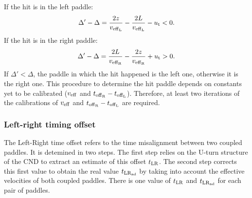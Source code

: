 If the hit is in the left paddle:
\begin{equation}
\Delta'-\Delta= \frac{2z}{v_{\rm{eff}_L}} - \frac{2L}{v_{\rm{eff}_L}} -u_{\rm{t}} <0.
\end{equation}
If the hit is in the right paddle:
\begin{equation}
\Delta'-\Delta= \frac{2L}{v_{\rm{eff}_{\rm{R}}}}-\frac{2z}{v_{\rm{eff}_{\rm{R}}}} +u_{\rm{t}} >0.
\end{equation}
If $\Delta'<\Delta$, the paddle in which the hit happened is the left one, otherwise it is the right one. This procedure to determine the hit paddle depends on constants yet to be calibrated ($v_{\rm{eff}}$ and $t_{\rm{off}_{\rm{R}}}-t_{\rm{off}_{\rm{L}}}$). Therefore, at least two iterations of the calibrations of $v_{\rm{eff}}$ and $t_{\rm{off}_{\rm{R}}}-t_{\rm{off}_{\rm{L}}}$ are required.

\subsubsection{Left-right timing offset}

The Left-Right time offset refers to the time misalignment between two coupled paddles. It is detemined in two steps. The first step relies on the U-turn structure of the CND to extract an estimate of this offset $t_{\rm{LR}}$. The second step corrects this first value to obtain the real value $t_{\rm{LR}_{\rm{ad}}}$ by taking into account the effective velocities of both coupled paddles. There is one value of $t_{\rm{LR}}$ and $t_{\rm{LR}_{\rm{ad}}}$ for each pair of paddles. 

